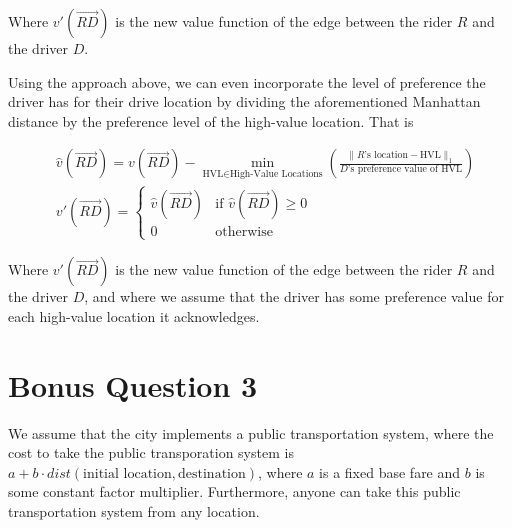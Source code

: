 \documentclass{article}
\begin{document}
\noindent
Where $v'(\overrightarrow{RD})$ is the new value function of the edge between the rider $R$ and the driver $D$.

Using the approach above, we can even incorporate the level of preference the driver has for their drive location by dividing the aforementioned Manhattan distance by the preference level of the high-value location. That is


\begin{align*}
    & \hat{v}(\overrightarrow{RD}) = v(\overrightarrow{RD}) - \min_{\text{HVL} \in \text{High-Value Locations}}{\left( \frac{\|R\text{'s location} - \text{HVL}\|_1}{D \text{'s preference value of HVL}} \right)} \\
    & v'(\overrightarrow{RD}) = \begin{cases}
        \hat{v}(\overrightarrow{RD}) & \text{if } \hat{v}(\overrightarrow{RD}) \geq 0 \\
        0 & \text{otherwise}
    \end{cases}
\end{align*}

\noindent
Where $v'(\overrightarrow{RD})$ is the new value function of the edge between the rider $R$ and the driver $D$, and where we assume that the driver has some preference value for each high-value location it acknowledges.

\section{Bonus Question 3}

We assume that the city implements a public transportation system, where the cost to take the public transporation system is $a + b \cdot \textit{dist}(\text{initial location}, \text{destination})$, where $a$ is a fixed base fare and $b$ is some constant factor multiplier. Furthermore, anyone can take this public transportation system from any location.
\end{document}
